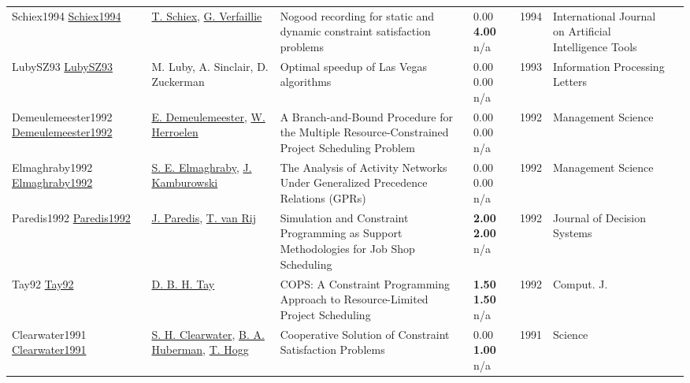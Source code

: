 {\begin{longtable}{p{3cm}p{5cm}p{10cm}p{1cm}rp{2.5cm}l}
Schiex1994 \href{http://dx.doi.org/10.1142/s0218213094000108}{Schiex1994} & \hyperref[auth:a1718]{T. Schiex}, \hyperref[auth:a1719]{G. Verfaillie} & Nogood recording for static and dynamic constraint satisfaction problems & \noindent{}\textcolor{black!50}{0.00} \textbf{4.00} n/a & 1994 & International Journal on Artificial Intelligence Tools & \cite{Schiex1994}\\
LubySZ93 \href{http://dx.doi.org/10.1016/0020-0190(93)90029-9}{LubySZ93} & M. Luby, A. Sinclair, D. Zuckerman & Optimal speedup of Las Vegas algorithms & \noindent{}\textcolor{black!50}{0.00} \textcolor{black!50}{0.00} n/a & 1993 & Information Processing Letters & \cite{LubySZ93}\\
Demeulemeester1992 \href{http://dx.doi.org/10.1287/mnsc.38.12.1803}{Demeulemeester1992} & \hyperref[auth:a1089]{E. Demeulemeester}, \hyperref[auth:a1101]{W. Herroelen} & A Branch-and-Bound Procedure for the Multiple Resource-Constrained Project Scheduling Problem & \noindent{}\textcolor{black!50}{0.00} \textcolor{black!50}{0.00} n/a & 1992 & Management Science & \cite{Demeulemeester1992}\\
Elmaghraby1992 \href{http://dx.doi.org/10.1287/mnsc.38.9.1245}{Elmaghraby1992} & \hyperref[auth:a1770]{S. E. Elmaghraby}, \hyperref[auth:a1771]{J. Kamburowski} & The Analysis of Activity Networks Under Generalized Precedence Relations (GPRs) & \noindent{}\textcolor{black!50}{0.00} \textcolor{black!50}{0.00} n/a & 1992 & Management Science & \cite{Elmaghraby1992}\\
Paredis1992 \href{http://dx.doi.org/10.1080/12460125.1992.10511509}{Paredis1992} & \hyperref[auth:a1995]{J. Paredis}, \hyperref[auth:a1996]{T. van Rij} & Simulation and Constraint Programming as Support Methodologies for Job Shop Scheduling & \noindent{}\textbf{2.00} \textbf{2.00} n/a & 1992 & Journal of Decision Systems & \cite{Paredis1992}\\
Tay92 \href{}{Tay92} & \hyperref[auth:a700]{D. B. H. Tay} & {COPS:} {A} Constraint Programming Approach to Resource-Limited Project Scheduling & \noindent{}\textbf{1.50} \textbf{1.50} n/a & 1992 & Comput. J. & \cite{Tay92}\\
Clearwater1991 \href{http://dx.doi.org/10.1126/science.254.5035.1181}{Clearwater1991} & \hyperref[auth:a1773]{S. H. Clearwater}, \hyperref[auth:a1774]{B. A. Huberman}, \hyperref[auth:a1775]{T. Hogg} & Cooperative Solution of Constraint Satisfaction Problems & \noindent{}\textcolor{black!50}{0.00} \textbf{1.00} n/a & 1991 & Science & \cite{Clearwater1991}\\

\end{longtable}}
